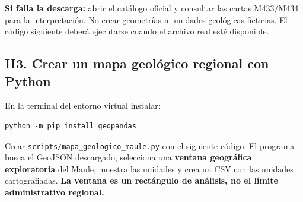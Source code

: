 \documentclass[11pt,a4paper]{article}
\begin{document}
\textbf{Si falla la descarga:} abrir el catálogo oficial y consultar
las cartas M433/M434 para la interpretación. No crear geometrías ni
unidades geológicas ficticias. El código siguiente deberá ejecutarse
cuando el archivo real esté disponible.

\subsection{H3. Crear un mapa geológico regional con Python}
En la terminal del entorno virtual instalar:
\begin{lstlisting}
python -m pip install geopandas
\end{lstlisting}
Crear \texttt{scripts/mapa\_geologico\_maule.py} con el siguiente código.
 El programa busca el GeoJSON descargado, selecciona una \textbf{ventana
geográfica exploratoria} del Maule, muestra las unidades y crea un CSV
con las unidades cartografiadas. \textbf{La ventana es un rectángulo de
análisis, no el límite administrativo regional.}
\end{document}
